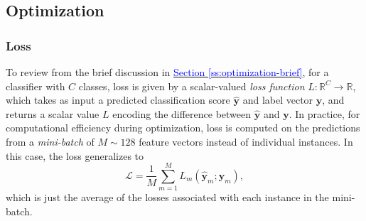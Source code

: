 \documentclass[11pt, a4paper]{article}
\newcommand{\myhref}[2]{\hyperref[#1]{\textcolor{blue}{#2}}}
\renewcommand{\vec}[1]{\bm{#1}}
\newcommand{\y}{\vec{y}}
\begin{document}
\subsection{Optimization} \label{ss:optimization}
\subsubsection{Loss} \label{sss:loss}
To review from the brief discussion in \myhref{ss:optimization-brief}{Section \ref{ss:optimization-brief}}, for a classifier with $ C $ classes, loss is given by a scalar-valued \textit{loss function} $ L : \mathbb{R}^{C} \to \mathbb{R} $, which takes as input a predicted classification score $ \hat{\y} $ and label vector $ \y $, and returns a scalar value $ L $ encoding the difference between $ \hat{\y} $ and $ \y $.
In practice, for computational efficiency during optimization, loss is computed on the predictions from a \textit{mini-batch} of $ M \sim 128 $ feature vectors instead of individual instances.
In this case, the loss generalizes to
\begin{equation}
    \mathcal{L} = \frac{1}{M} \sum_{m = 1}^{M} L_{m} (\hat{\y}_{m}; \y_{m}), \label{eq:loss-batch}
\end{equation}
which is just the average of the losses associated with each instance in the mini-batch.
\end{document}
